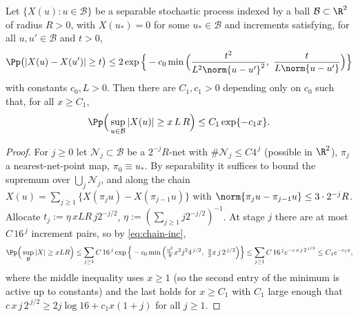 \closuredraft
\begin{lemma}\label{lem:chain2d}
Let $\{X(u):u\in\mathcal B\}$ be a separable stochastic process indexed by a
ball $\mathcal B\subset\R^2$ of radius $R>0$, with $X(u_\ast)=0$ for some
$u_\ast\in\mathcal B$ and increments satisfying, for all
$u,u'\in\mathcal B$ and $t>0$,
\begin{equation}\label{eq:chain-inc}
 \Pp\big(|X(u)-X(u')|\ge t\big)
 \le2\exp\Big\{-c_0\min\Big(\frac{t^2}{L^2\norm{u-u'}^2},\
 \frac{t}{L\norm{u-u'}}\Big)\Big\}
\end{equation}
with constants $c_0,L>0$. Then there are $C_1,c_1>0$ depending only on
$c_0$ such that, for all $x\ge C_1$,
\[
 \Pp\Big(\sup_{u\in\mathcal B}|X(u)|\ge x\,L\,R\Big)
 \le C_1\exp\{-c_1x\}.
\]
\end{lemma}
\begin{proof}
For $j\ge0$ let $\mathcal N_j\subset\mathcal B$ be a $2^{-j}R$-net with
$\#\mathcal N_j\le C4^{\,j}$ (possible in $\R^2$), $\pi_j$ a
nearest-net-point map, $\pi_0\equiv u_\ast$. By separability it suffices to
bound the supremum over $\bigcup_j\mathcal N_j$, and along the chain
$X(u)=\sum_{j\ge1}\{X(\pi_ju)-X(\pi_{j-1}u)\}$ with
$\norm{\pi_ju-\pi_{j-1}u}\le3\cdot2^{-j}R$. Allocate
$t_j:=\eta\,xLR\,j2^{-j/2}$, $\eta:=(\sum_{j\ge1}j2^{-j/2})^{-1}$. At stage
$j$ there are at most $C\,16^{\,j}$ increment pairs, so by
\eqref{eq:chain-inc},
\[
 \Pp\Big(\sup_{\mathcal B}|X|\ge xLR\Big)
 \le\sum_{j\ge1}C\,16^{\,j}
 \exp\Big\{-c_0\min\Big(\tfrac{\eta^2}{9}x^2j^24^{\,j/2},\
 \tfrac{\eta}{3}x\,j\,2^{\,j/2}\Big)\Big\}
 \le\sum_{j\ge1}C\,16^{\,j}e^{-c\,x\,j\,2^{\,j/2}}
 \le C_1e^{-c_1x},
\]
where the middle inequality uses $x\ge1$ (so the second entry of the
minimum is active up to constants) and the last holds for $x\ge C_1$ with
$C_1$ large enough that $c\,x\,j\,2^{\,j/2}\ge2j\log16+c_1x(1+j)$ for all
$j\ge1$.
\end{proof}

